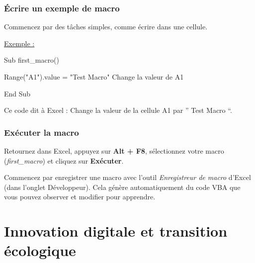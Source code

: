 \documentclass[
  letterpaper,
  DIV=11,
  numbers=noendperiod]{scrartcl}
\newenvironment{Shaded}{\begin{snugshade}}{\end{snugshade}}
\newcommand{\NormalTok}[1]{\textcolor[rgb]{0.00,0.23,0.31}{#1}}
\begin{document}
\subsubsection{Écrire un exemple de
macro}\label{uxe9crire-un-exemple-de-macro}

Commencez par des tâches simples, comme écrire dans une cellule.

\ul{Exemple :}

\begin{Shaded}
\begin{Highlighting}[]
\NormalTok{Sub first\_macro()}

\NormalTok{  Range("A1").value = "Test Macro" \textquotesingle{} Change la valeur de A1}

\NormalTok{End Sub}
\end{Highlighting}
\end{Shaded}

Ce code dit à Excel : Change la valeur de la cellule A1 par '' Test
Macro ``.

\subsubsection{Exécuter la macro}\label{exuxe9cuter-la-macro}

Retournez dans Excel, appuyez sur \textbf{Alt + F8}, sélectionnez votre
macro (\emph{first\_macro}) et cliquez sur \textbf{Exécuter}.

\begin{tcolorbox}[enhanced jigsaw, opacityback=0, colback=white, colbacktitle=quarto-callout-tip-color!10!white, breakable, rightrule=.15mm, toptitle=1mm, arc=.35mm, title=\textcolor{quarto-callout-tip-color}{\faLightbulb}\hspace{0.5em}{Tip}, toprule=.15mm, bottomtitle=1mm, leftrule=.75mm, titlerule=0mm, bottomrule=.15mm, left=2mm, opacitybacktitle=0.6, coltitle=black, colframe=quarto-callout-tip-color-frame]

Commencez par enregistrer une macro avec l'outil \emph{Enregistreur de
macro} d'Excel (dans l'onglet Développeur). Cela génère automatiquement
du code VBA que vous pouvez observer et modifier pour apprendre.

\end{tcolorbox}

\section{Innovation digitale et transition
écologique}\label{innovation-digitale-et-transition-uxe9cologique}
\end{document}
